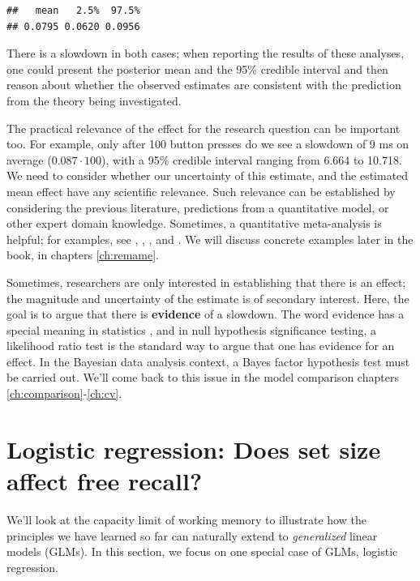 \documentclass[12pt,]{krantz}
\theoremstyle{definition}
\theoremstyle{definition}
\theoremstyle{definition}
\theoremstyle{remark}
\begin{document}
\begin{verbatim}
##   mean   2.5%  97.5% 
## 0.0795 0.0620 0.0956
\end{verbatim}

There is a slowdown in both cases; when reporting the results of these analyses, one could present the posterior mean and the 95\% credible interval and then reason about whether the observed estimates are consistent with the prediction from the theory being investigated.

The practical relevance of the effect for the research question can be important too. For example, only after 100 button presses do we see a slowdown of 9 ms on average (\(0.087 \cdot 100\)), with a 95\% credible interval ranging from 6.664 to 10.718. We need to consider whether our uncertainty of this estimate, and the estimated mean effect have any scientific relevance. Such relevance can be established by considering the previous literature, predictions from a quantitative model, or other expert domain knowledge. Sometimes, a quantitative meta-analysis is helpful; for examples, see \citet{JaegerEngelmannVasishth2017}, \citet{mahowald2016meta}, \citet{NicenboimRoettgeretal}, and \citet{vasishthProcessingChineseRelative2013}. We will discuss concrete examples later in the book, in chapters \ref{ch:remame}.

Sometimes, researchers are only interested in establishing that there is an effect; the magnitude and uncertainty of the estimate is of secondary interest. Here, the goal is to argue that there is \textbf{evidence} of a slowdown. The word evidence has a special meaning in statistics \citep{Royall}, and in null hypothesis significance testing, a likelihood ratio test is the standard way to argue that one has evidence for an effect. In the Bayesian data analysis context, a Bayes factor hypothesis test must be carried out. We'll come back to this issue in the model comparison chapters \ref{ch:comparison}-\ref{ch:cv}.

\hypertarget{sec:logistic}{%
\section{Logistic regression: Does set size affect free recall?}\label{sec:logistic}}

We'll look at the capacity limit of working memory to illustrate how the principles we have learned so far can naturally extend to \emph{generalized} linear models (GLMs). In this section, we focus on one special case of GLMs, logistic regression.
\end{document}
